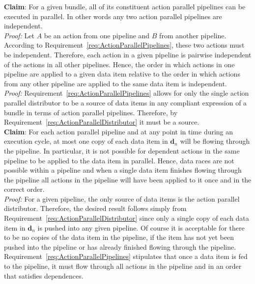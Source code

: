 \documentclass{article}
\begin{document}
\textbf{Claim}: For a given bundle, all of its constituent action parallel
pipelines can be executed in parallel.  In other words any two action parallel
pipelines are independent.\\[0.05in]
\textit{Proof:}\hspace{0.125in}  Let $A$ be an action from one pipeline and $B$
from another pipeline.  According to
Requirement~\ref{req:ActionParallelPipelines}, these two actions must be
independent.  Therefore, each action in a given pipeline is pairwise
independent of the actions in all other pipelines.  Hence, the order in which
actions in one pipeline are applied to a given data item relative to the order in which actions
from any other pipeline are applied to the same data item is
independent.\\[0.05in]

\textit{Proof:}\hspace{0.125in}
Requirement~\ref{req:ActionParallelPipelines} allows for only the single action
parallel distributor to be a
source of data items in any compliant expression of a bundle in terms of action
parallel pipelines.  Therefore, by
Requirement~\ref{req:ActionParallelDistributor} it must be a source.\\

\textbf{Claim}: For each action parallel pipeline and at any point in time during
an execution cycle, at most one copy of each data item in $\mathbf{d}_n$ will be
flowing through the pipeline.  In particular, it is not possible for dependent
actions in the same pipeline to be applied to the data item in parallel.  Hence,
data races are not possible within a pipeline and when a single data item
finishes flowing through the pipeline all actions in the pipeline will have been
applied to it once and in the correct order.\\[0.05in]
\textit{Proof:}\hspace{0.125in}  For a given pipeline, the only source of data
items is the action parallel distributor.  Therefore, the desired result follows
simply from Requirement~\ref{req:ActionParallelDistributor} since only a single
copy of each data item in $\mathbf{d}_n$ is pushed into any given pipeline.  Of
course it is acceptable for there to be no copies of the data item in the
pipeline, if the item has not yet been pushed into the pipeline or has already
finished flowing through the pipeline.
Requirement~\ref{req:ActionParallelPipelines} stipulates that once a data item
is fed to the pipeline, it must flow through all actions in the pipeline and in
an order that satisfies dependences.\\
\end{document}
